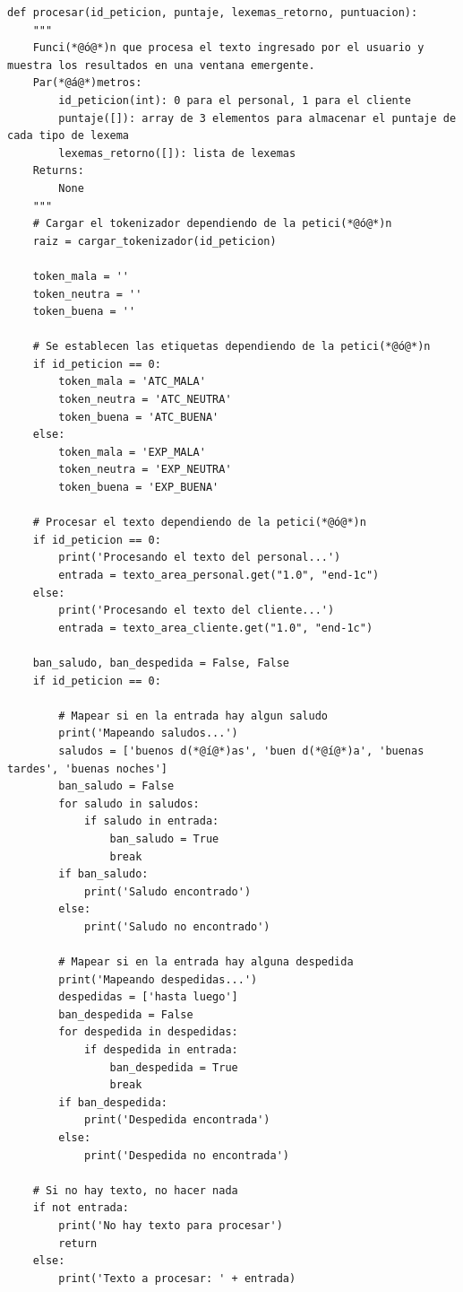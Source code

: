 \documentclass[10pt,times,twocolumn]{article}
\begin{document}
\begin{lstlisting}[caption={Core del análisis. Procesar}, xleftmargin=0.05\textwidth]
def procesar(id_peticion, puntaje, lexemas_retorno, puntuacion):
    """
    Funci(*@ó@*)n que procesa el texto ingresado por el usuario y muestra los resultados en una ventana emergente.
    Par(*@á@*)metros:
        id_peticion(int): 0 para el personal, 1 para el cliente
        puntaje([]): array de 3 elementos para almacenar el puntaje de cada tipo de lexema
        lexemas_retorno([]): lista de lexemas
    Returns:
        None
    """
    # Cargar el tokenizador dependiendo de la petici(*@ó@*)n
    raiz = cargar_tokenizador(id_peticion)

    token_mala = ''
    token_neutra = ''
    token_buena = ''

	# Se establecen las etiquetas dependiendo de la petici(*@ó@*)n
    if id_peticion == 0:
        token_mala = 'ATC_MALA'
        token_neutra = 'ATC_NEUTRA'
        token_buena = 'ATC_BUENA'
    else:
        token_mala = 'EXP_MALA'
        token_neutra = 'EXP_NEUTRA'
        token_buena = 'EXP_BUENA'

    # Procesar el texto dependiendo de la petici(*@ó@*)n
    if id_peticion == 0:
        print('Procesando el texto del personal...')
        entrada = texto_area_personal.get("1.0", "end-1c")
    else:
        print('Procesando el texto del cliente...')
        entrada = texto_area_cliente.get("1.0", "end-1c")
    
    ban_saludo, ban_despedida = False, False
    if id_peticion == 0:

        # Mapear si en la entrada hay algun saludo
        print('Mapeando saludos...')
        saludos = ['buenos d(*@í@*)as', 'buen d(*@í@*)a', 'buenas tardes', 'buenas noches']
        ban_saludo = False
        for saludo in saludos:
            if saludo in entrada:
                ban_saludo = True
                break
        if ban_saludo:
            print('Saludo encontrado')
        else:
            print('Saludo no encontrado')

        # Mapear si en la entrada hay alguna despedida
        print('Mapeando despedidas...')
        despedidas = ['hasta luego']
        ban_despedida = False
        for despedida in despedidas:
            if despedida in entrada:
                ban_despedida = True
                break
        if ban_despedida:
            print('Despedida encontrada')
        else:
            print('Despedida no encontrada')
        
    # Si no hay texto, no hacer nada
    if not entrada:
        print('No hay texto para procesar')
        return
    else:
        print('Texto a procesar: ' + entrada)


\end{lstlisting}
\end{document}
